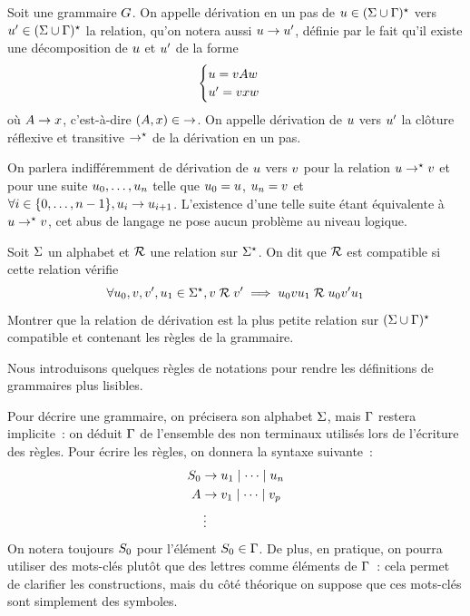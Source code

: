 \begin{definition}[Dérivation]
  Soit une grammaire $G$. On appelle dérivation en un pas de
  $u \in (\Sigma\cup \Gamma)^{\star}$ vers
  $u' \in (\Sigma\cup\Gamma)^{\star}$ la
  relation, qu'on notera aussi $u \to u'$, définie par le fait qu'il
  existe une décomposition de $u$ et $u'$ de la forme
  \[\begin{cases}
  u = v Aw\\
  u' =v xw
  \end{cases}\]
  où $A \to x$, c'est-à-dire $(A,x) \in \mathord{\to}$. On
  appelle dérivation de $u$ vers $u'$ la clôture réflexive et
  transitive $\to^{\mathord{\star}}$ de la dérivation en un pas.
\end{definition}

\begin{remark}
  On parlera indifféremment de dérivation de $u$ vers $v$ pour la
  relation $u \to^{\mathord{\star}} v$ et pour une suite
  $u_0,\ldots,u_n$ telle que $u_0 = u$,
  $u_n = v$ et $\forall i \in \{0,\ldots,n - 1\},u_i \to u_{i+1}$.
  L'existence d'une telle suite étant équivalente à $u \to^{\mathord{\star}}v$,
  cet abus de langage ne pose aucun problème au niveau logique.
\end{remark}

\begin{exercise}
  Soit $\Sigma$ un alphabet et $\mathrel{\mathcal{R}}$ une relation sur $\Sigma^{\star}$. On dit que
  $\mathrel{\mathcal{R}}$ est compatible si cette relation vérifie
  \[\forall u_0,v,v',u_1\in\Sigma^{\star},
  v\mathrel{\mathcal{R}}v' \implies
  u_0vu_1\mathrel{\mathcal{R}}u_0v'u_1\]
  Montrer que la relation de dérivation est la plus petite relation sur
  $(\Sigma\cup\Gamma)^{\star}$ compatible et contenant les règles de la grammaire.
\end{exercise}

Nous introduisons quelques règles de notations pour rendre les définitions de
grammaires plus lisibles.

\begin{notation}
  Pour décrire une grammaire, on précisera son alphabet $\Sigma$, mais $\Gamma$
  restera implicite~: on déduit $\Gamma$ de l'ensemble des non terminaux utilisés
  lors de l'écriture des règles. Pour écrire les règles, on donnera la syntaxe
  suivante~:
  \begin{align*}
    S_{0} &\to u_1\mid \cdots\mid u_n\\
    A &\to v_1\mid\cdots\mid v_p\\
    &\vdots
  \end{align*}
  On notera toujours $S_{0}$ pour l'élément $S_{0} \in \Gamma$. De plus, en
  pratique, on pourra utiliser des mots-clés plutôt que des lettres comme
  éléments de $\Gamma$~: cela permet de clarifier les constructions, mais du côté
  théorique on suppose que ces mots-clés sont simplement des symboles.
\end{notation}

